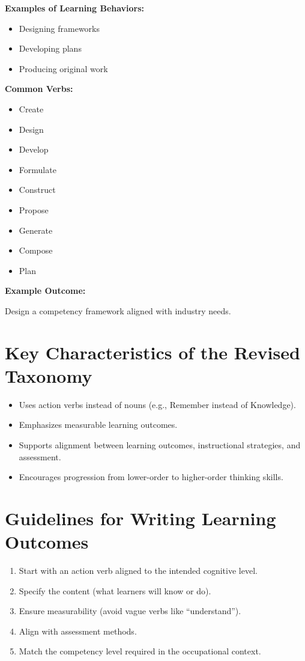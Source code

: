 \documentclass[12pt]{article}
\begin{document}
\textbf{Examples of Learning Behaviors:}

\begin{itemize}
    \item Designing frameworks
    \item Developing plans
    \item Producing original work
\end{itemize}

\textbf{Common Verbs:}

\begin{itemize}
    \item Create
    \item Design
    \item Develop
    \item Formulate
    \item Construct
    \item Propose
    \item Generate
    \item Compose
    \item Plan
\end{itemize}

\textbf{Example Outcome:}

Design a competency framework aligned with industry needs.

\section{Key Characteristics of the Revised Taxonomy}

\begin{itemize}
    \item Uses action verbs instead of nouns (e.g., Remember instead of Knowledge).
    \item Emphasizes measurable learning outcomes.
    \item Supports alignment between learning outcomes, instructional strategies, and assessment.
    \item Encourages progression from lower-order to higher-order thinking skills.
\end{itemize}

\section{Guidelines for Writing Learning Outcomes}

\begin{enumerate}
    \item Start with an action verb aligned to the intended cognitive level.
    \item Specify the content (what learners will know or do).
    \item Ensure measurability (avoid vague verbs like ``understand'').
    \item Align with assessment methods.
    \item Match the competency level required in the occupational context.
\end{enumerate}
\end{document}
